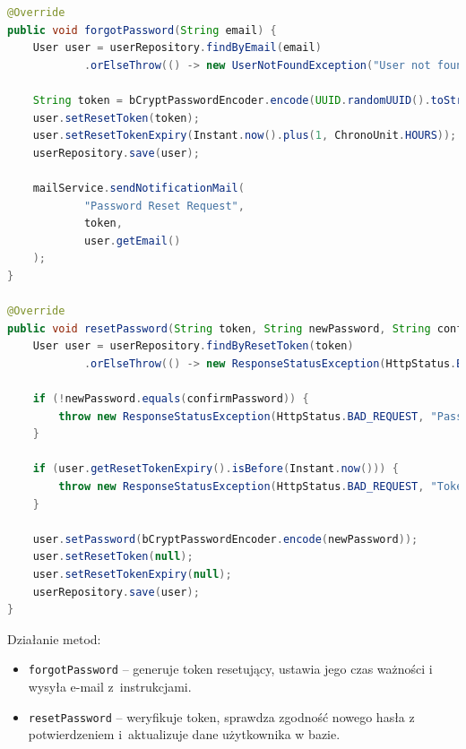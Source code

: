 \begin{lstlisting}[language=Java, style=JavaStyle, caption=Metody resetowania hasła w klasie \texttt{AuthServiceImp}]
@Override
public void forgotPassword(String email) {
    User user = userRepository.findByEmail(email)
            .orElseThrow(() -> new UserNotFoundException("User not found"));

    String token = bCryptPasswordEncoder.encode(UUID.randomUUID().toString());
    user.setResetToken(token);
    user.setResetTokenExpiry(Instant.now().plus(1, ChronoUnit.HOURS));
    userRepository.save(user);

    mailService.sendNotificationMail(
            "Password Reset Request",
            token,
            user.getEmail()
    );
}

@Override
public void resetPassword(String token, String newPassword, String confirmPassword) {
    User user = userRepository.findByResetToken(token)
            .orElseThrow(() -> new ResponseStatusException(HttpStatus.BAD_REQUEST, "Invalid token"));

    if (!newPassword.equals(confirmPassword)) {
        throw new ResponseStatusException(HttpStatus.BAD_REQUEST, "Passwords do not match");
    }

    if (user.getResetTokenExpiry().isBefore(Instant.now())) {
        throw new ResponseStatusException(HttpStatus.BAD_REQUEST, "Token has expired");
    }

    user.setPassword(bCryptPasswordEncoder.encode(newPassword));
    user.setResetToken(null);
    user.setResetTokenExpiry(null);
    userRepository.save(user);
}
\end{lstlisting}

\noindent Działanie metod:
\begin{itemize}
    \item \texttt{forgotPassword} -- generuje token resetujący, ustawia jego czas ważności i wysyła e-mail z~instrukcjami.
    \item \texttt{resetPassword} -- weryfikuje token, sprawdza zgodność nowego hasła z potwierdzeniem i~aktualizuje dane użytkownika w bazie.
\end{itemize}

